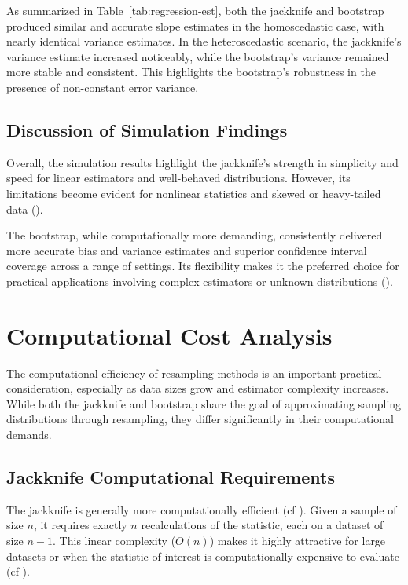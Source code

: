 \documentclass[aodsor,preprint]{imsart}
\numberwithin{equation}{section}
\theoremstyle{plain}
\begin{document}
As summarized in Table~\ref{tab:regression-est}, both the jackknife and bootstrap produced similar and accurate slope estimates in the homoscedastic case, with nearly identical variance estimates. In the heteroscedastic scenario, the jackknife’s variance estimate increased noticeably, while the bootstrap’s variance remained more stable and consistent. This highlights the bootstrap’s robustness in the presence of non-constant error variance.

\subsection{Discussion of Simulation Findings}

Overall, the simulation results highlight the jackknife's strength in simplicity and speed for linear estimators and well-behaved distributions. However, its limitations become evident for nonlinear statistics and skewed or heavy-tailed data (\cite{efron1993introduction,shao1995jackknife,davison1997bootstrap}).


The bootstrap, while computationally more demanding, consistently delivered more accurate bias and variance estimates and superior confidence interval coverage across a range of settings. Its flexibility makes it the preferred choice for practical applications involving complex estimators or unknown distributions (\cite{davison1997bootstrap,efron1993introduction}).\\

\section{Computational Cost Analysis}

The computational efficiency of resampling methods is an important practical consideration, especially as data sizes grow and estimator complexity increases. While both the jackknife and bootstrap share the goal of approximating sampling distributions through resampling, they differ significantly in their computational demands.\\

\subsection{Jackknife Computational Requirements}

The jackknife is generally more computationally efficient (cf \cite{shao1995jackknife,efron1982jackknife}). Given a sample of size $n$, it requires exactly $n$ recalculations of the statistic, each on a dataset of size $n - 1$. This linear complexity ($O(n)$) makes it highly attractive for large datasets or when the statistic of interest is computationally expensive to evaluate (cf \cite{shao1995jackknife}).\\
\end{document}
